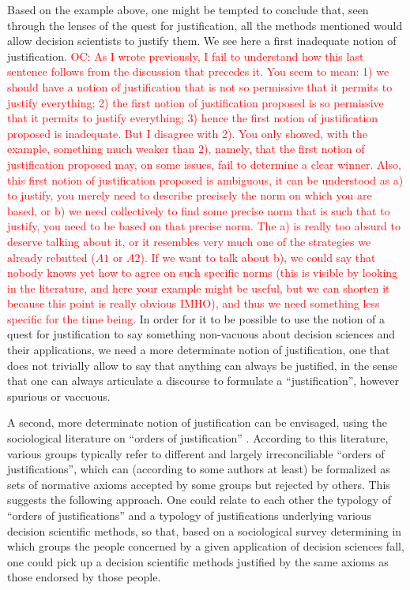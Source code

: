 \documentclass[preprint, french, english, 11pt, authoryear]{elsarticle}%
\newcommand{\commentOC}[1]{\textcolor{red}{OC: #1}}
\begin{document}
Based on the example above, one might be tempted to conclude that, seen through the lenses of the quest for justification, all the methods mentioned would allow decision scientists to justify them. We see here a first inadequate notion of justification. 
\commentOC{As I wrote previously, I fail to understand how this last sentence follows from the discussion that precedes it. You seem to mean: 1) we should have a notion of justification that is not so permissive that it permits to justify everything; 2) the first notion of justification proposed is so permissive that it permits to justify everything; 3) hence the first notion of justification proposed is inadequate. But I disagree with 2). You only showed, with the example, something much weaker than 2), namely, that the first notion of justification proposed may, on some issues, fail to determine a clear winner. Also, this first notion of justification proposed is ambiguous, it can be understood as a) to justify, you merely need to describe precisely the norm on which you are based, or b) we need collectively to find some precise norm that is such that to justify, you need to be based on that precise norm. The a) is really too absurd to deserve talking about it, or it resembles very much one of the strategies we already rebutted ($A1$ or $A2$). If we want to talk about b), we could say that nobody knows yet how to agree on such specific norms (this is visible by looking in the literature, and here your example might be useful, but we can shorten it because this point is really obvious IMHO), and thus we need something less specific for the time being.}
In order for it to be possible to use the notion of a quest for justification to say something non-vacuous about decision sciences and their applications, we need a more determinate notion of justification, one that does not trivially allow to say that anything can always be justified, in the sense that one can always articulate a discourse to formulate a ``justification'', however spurious or vaccuous.

A second, more determinate notion of justification can be envisaged, using the sociological literature on ``orders of justification'' \citep{boltanski_justification_2006}. According to this literature, various groups typically refer to different and largely irreconciliable ``orders of justifications'', which can (according to some authors at least) be formalized as sets of normative axioms accepted by some groups but rejected by others. This suggests the following approach. One could relate to each other the typology of ``orders of justifications'' and a typology of justifications underlying various decision scientific methods, so that, based on a sociological survey determining in which groups the people concerned by a given application of decision sciences fall, one could pick up a decision scientific methods justified by the same axioms as those endorsed by those people.
\end{document}
